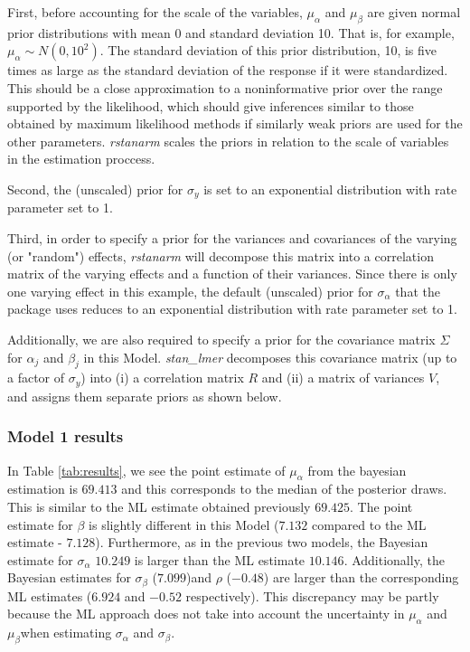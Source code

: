 First, before accounting for the scale of the variables, $\mu_{\alpha}$ and $\mu_{\beta}$ are given normal prior distributions with mean 0 and standard deviation 10.  That is, for example, $\mu_{\alpha} \sim N(0, 10^2)$. The standard deviation of this prior distribution, 10, is five times as large as the standard deviation of the response if it were standardized. This should be a close approximation to a noninformative prior over the range supported by the likelihood, which should give inferences similar to those obtained by maximum likelihood methods if similarly weak priors are used for the other parameters. \textit{rstanarm} scales the priors in relation to the scale of variables in the estimation proccess.

Second, the (unscaled) prior for $\sigma_{y}$ is set to an exponential distribution with rate parameter set to 1.

Third, in order to specify a prior for the variances and covariances of the varying (or "random") effects, \textit{rstanarm} will decompose this matrix into a correlation matrix of the varying effects and a function of their variances.  Since there is only one varying effect in this example, the default (unscaled) prior for $\sigma_{\alpha}$ that the package uses reduces to an exponential distribution with rate parameter set to 1.

Additionally, we are also required to specify a prior for the covariance matrix $\Sigma$ for $\alpha_j$ and $\beta_j$ in this Model.  \textit{stan\_lmer} decomposes this covariance matrix (up to a factor of $\sigma_y$) into (i) a correlation matrix $R$ and (ii) a matrix of variances $V$, and assigns them separate priors as shown below.

\subsubsection*{Model 1 results}
In Table \ref{tab:results}, we see the point estimate of $\mu_{\alpha}$ from the bayesian estimation is $69.413$ and this corresponds to the median of the posterior draws.  This is similar to the ML estimate obtained previously $69.425$.  The point estimate for $\beta$ is slightly different in this Model ($7.132$ compared to the ML estimate -  $7.128$).  Furthermore, as in the previous two models, the Bayesian estimate for $\sigma_{\alpha}$ $10.249$ is larger than the ML estimate $10.146$. Additionally, the Bayesian estimates for $\sigma_{\beta}$ ($7.099$)and $\rho$ ($-0.48$) are larger than the corresponding ML estimates ($6.924$ and $-0.52$ respectively). This discrepancy may be partly because the ML approach does not take into account the uncertainty in $\mu_{\alpha}$ and $\mu_{\beta}$when estimating $\sigma_{\alpha}$ and $\sigma_{\beta}$.

